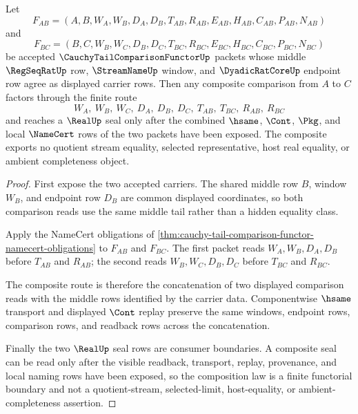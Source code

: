 \begin{theorem}
\label{thm:cauchy-tail-comparison-functor-composition-law}
Let
$$
F_{AB}=(A,B,W_A,W_B,D_A,D_B,T_{AB},R_{AB},E_{AB},H_{AB},C_{AB},P_{AB},N_{AB})
$$
and
$$
F_{BC}=(B,C,W_B,W_C,D_B,D_C,T_{BC},R_{BC},E_{BC},H_{BC},C_{BC},P_{BC},N_{BC})
$$
be accepted $\CauchyTailComparisonFunctorUp$ packets whose middle $\RegSeqRatUp$ row, $\StreamNameUp$ window, and $\DyadicRatCoreUp$ endpoint row agree as displayed carrier rows. Then any composite comparison from $A$ to $C$ factors through the finite route
$$
W_A,\ W_B,\ W_C,\ D_A,\ D_B,\ D_C,\ T_{AB},\ T_{BC},\ R_{AB},\ R_{BC}
$$
and reaches a $\RealUp$ seal only after the combined $\hsame$, $\Cont$, $\Pkg$, and local $\NameCert$ rows of the two packets have been exposed. The composite exports no quotient stream equality, selected representative, host real equality, or ambient completeness object.
\end{theorem}
\begin{proof}
First expose the two accepted carriers. The shared middle row $B$, window $W_B$, and endpoint row $D_B$ are common displayed coordinates, so both comparison reads use the same middle tail rather than a hidden equality class.

Apply the NameCert obligations of \autoref{thm:cauchy-tail-comparison-functor-namecert-obligations} to $F_{AB}$ and $F_{BC}$. The first packet reads $W_A,W_B,D_A,D_B$ before $T_{AB}$ and $R_{AB}$; the second reads $W_B,W_C,D_B,D_C$ before $T_{BC}$ and $R_{BC}$.

The composite route is therefore the concatenation of two displayed comparison reads with the middle rows identified by the carrier data. Componentwise $\hsame$ transport and displayed $\Cont$ replay preserve the same windows, endpoint rows, comparison rows, and readback rows across the concatenation.

Finally the two $\RealUp$ seal rows are consumer boundaries. A composite seal can be read only after the visible readback, transport, replay, provenance, and local naming rows have been exposed, so the composition law is a finite functorial boundary and not a quotient-stream, selected-limit, host-equality, or ambient-completeness assertion.
\end{proof}


